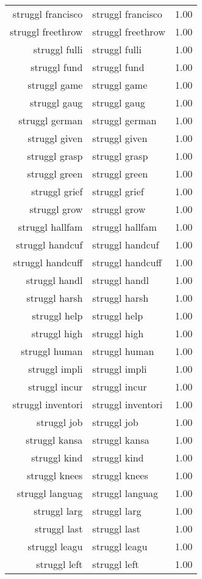 \begin{table}[ht]
\begin{tabular}{rlr}
  struggl francisco & struggl francisco & 1.00 \\ 
  struggl freethrow & struggl freethrow & 1.00 \\ 
  struggl fulli & struggl fulli & 1.00 \\ 
  struggl fund & struggl fund & 1.00 \\ 
  struggl game & struggl game & 1.00 \\ 
  struggl gaug & struggl gaug & 1.00 \\ 
  struggl german & struggl german & 1.00 \\ 
  struggl given & struggl given & 1.00 \\ 
  struggl grasp & struggl grasp & 1.00 \\ 
  struggl green & struggl green & 1.00 \\ 
  struggl grief & struggl grief & 1.00 \\ 
  struggl grow & struggl grow & 1.00 \\ 
  struggl hallfam & struggl hallfam & 1.00 \\ 
  struggl handcuf & struggl handcuf & 1.00 \\ 
  struggl handcuff & struggl handcuff & 1.00 \\ 
  struggl handl & struggl handl & 1.00 \\ 
  struggl harsh & struggl harsh & 1.00 \\ 
  struggl help & struggl help & 1.00 \\ 
  struggl high & struggl high & 1.00 \\ 
  struggl human & struggl human & 1.00 \\ 
  struggl impli & struggl impli & 1.00 \\ 
  struggl incur & struggl incur & 1.00 \\ 
  struggl inventori & struggl inventori & 1.00 \\ 
  struggl job & struggl job & 1.00 \\ 
  struggl kansa & struggl kansa & 1.00 \\ 
  struggl kind & struggl kind & 1.00 \\ 
  struggl knees & struggl knees & 1.00 \\ 
  struggl languag & struggl languag & 1.00 \\ 
  struggl larg & struggl larg & 1.00 \\ 
  struggl last & struggl last & 1.00 \\ 
  struggl leagu & struggl leagu & 1.00 \\ 
  struggl left & struggl left & 1.00 \\ 

\end{tabular}
\end{table}
